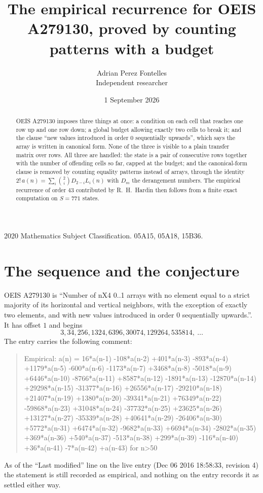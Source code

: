 \documentclass[11pt,a4paper]{article}
\title{The empirical recurrence for OEIS A279130, proved by counting patterns with a budget}
\author{Adrian Perez Fontelles\\ \small Independent researcher}
\date{1 September 2026}
\theoremstyle{plain}
\theoremstyle{definition}
\begin{document}
\maketitle

\begin{abstract}
OEIS A279130 imposes three things at once: a condition on each cell that reaches one row up and
one row down; a global budget allowing exactly two cells to
break it; and the clause ``new values introduced in order $0$ sequentially upwards'', which
says the array is written in canonical form. None of the three is visible to a plain transfer
matrix over rows. All three are handled: the state is a pair of consecutive rows
together with the number of offending cells so far, capped at the budget; and the
canonical-form clause is removed by counting equality patterns instead of arrays, through the
identity $2!\,a(n)=\sum_i\binom{2}{i}D_{2-i}L_i(n)$ with $D_m$ the derangement
numbers. The empirical recurrence of order $43$ contributed by R.~H.~Hardin then follows
from a finite exact computation on $S=771$ states.
\end{abstract}

\noindent\small 2020 Mathematics Subject Classification. 05A15, 05A18, 15B36.\normalsize

\section{The sequence and the conjecture}

OEIS A279130 is ``Number of nX4 0..1 arrays with no element equal to a strict majority of its horizontal and vertical neighbors, with the exception of exactly two elements, and with new values introduced in order 0 sequentially upwards.''. It has offset $1$ and begins
\[
3, 34, 256, 1324, 6396, 30074, 129264, 535814,\ \dots
\]
The entry carries the following comment:
\begin{quote}\small
Empirical: a(n) = 16*a(n-1) -108*a(n-2) +401*a(n-3) -893*a(n-4) +1179*a(n-5) -600*a(n-6) -1173*a(n-7) +3468*a(n-8) -5018*a(n-9) +6446*a(n-10) -8766*a(n-11) +8587*a(n-12) -1891*a(n-13) -12870*a(n-14) +29298*a(n-15) -31377*a(n-16) +26556*a(n-17) -29210*a(n-18) +21407*a(n-19) +1380*a(n-20) -39341*a(n-21) +76349*a(n-22) -59868*a(n-23) +31048*a(n-24) -37732*a(n-25) +23625*a(n-26) +13127*a(n-27) -35339*a(n-28) +40641*a(n-29) -26406*a(n-30) +5772*a(n-31) +6474*a(n-32) -9682*a(n-33) +6694*a(n-34) -2802*a(n-35) +369*a(n-36) +540*a(n-37) -513*a(n-38) +299*a(n-39) -116*a(n-40) +36*a(n-41) -7*a(n-42) +a(n-43) for n>50
\end{quote}
As of the ``Last modified'' line on the live entry (Dec 06 2016 18:58:33, revision 4) the statement is
still recorded as empirical, and nothing on the entry records it as settled either way.
\end{document}
